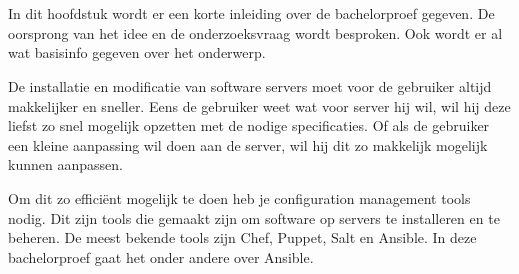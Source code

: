 
\chapter{}
\label{ch:inleiding}
In dit hoofdstuk wordt er een korte inleiding over de bachelorproef gegeven. De oorsprong van het idee en de onderzoeksvraag wordt besproken. Ook wordt er al wat basisinfo gegeven over het onderwerp.


De installatie en modificatie van software servers moet voor de gebruiker altijd makkelijker en sneller. Eens de gebruiker weet wat voor server hij wil, wil hij deze liefst zo snel mogelijk opzetten met de nodige specificaties. Of als de gebruiker een kleine aanpassing wil doen aan de server, wil hij dit zo makkelijk mogelijk kunnen aanpassen. 

Om dit zo efficiënt mogelijk te doen heb je configuration management tools nodig. Dit zijn tools die gemaakt zijn om software op servers te installeren en te beheren. De meest bekende tools zijn Chef, Puppet, Salt en Ansible. In deze bachelorproef gaat het onder andere over Ansible. 



\section{}
\label{sec:context}

